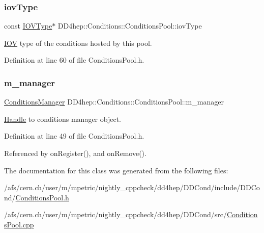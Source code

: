 \subsubsection{\texorpdfstring{iov\+Type}{iovType}}
{\footnotesize\ttfamily const \hyperlink{class_d_d4hep_1_1_i_o_v_type}{I\+O\+V\+Type}$\ast$ D\+D4hep\+::\+Conditions\+::\+Conditions\+Pool\+::iov\+Type}



\hyperlink{class_d_d4hep_1_1_i_o_v}{I\+OV} type of the conditions hosted by this pool. 



Definition at line 60 of file Conditions\+Pool.\+h.

\hypertarget{class_d_d4hep_1_1_conditions_1_1_conditions_pool_aae8c23b1a47bad8034196316a2fd41c9}{}\label{class_d_d4hep_1_1_conditions_1_1_conditions_pool_aae8c23b1a47bad8034196316a2fd41c9} 
\subsubsection{\texorpdfstring{m\+\_\+manager}{m\_manager}}
{\footnotesize\ttfamily \hyperlink{class_d_d4hep_1_1_conditions_1_1_conditions_manager}{Conditions\+Manager} D\+D4hep\+::\+Conditions\+::\+Conditions\+Pool\+::m\+\_\+manager\hspace{0.3cm}{\ttfamily [protected]}}



\hyperlink{class_d_d4hep_1_1_handle}{Handle} to conditions manager object. 



Definition at line 49 of file Conditions\+Pool.\+h.



Referenced by on\+Register(), and on\+Remove().



The documentation for this class was generated from the following files\+:\begin{DoxyCompactItemize}
\item 
/afs/cern.\+ch/user/m/mpetric/nightly\+\_\+cppcheck/dd4hep/\+D\+D\+Cond/include/\+D\+D\+Cond/\hyperlink{_conditions_pool_8h}{Conditions\+Pool.\+h}\item 
/afs/cern.\+ch/user/m/mpetric/nightly\+\_\+cppcheck/dd4hep/\+D\+D\+Cond/src/\hyperlink{_conditions_pool_8cpp}{Conditions\+Pool.\+cpp}\end{DoxyCompactItemize}
